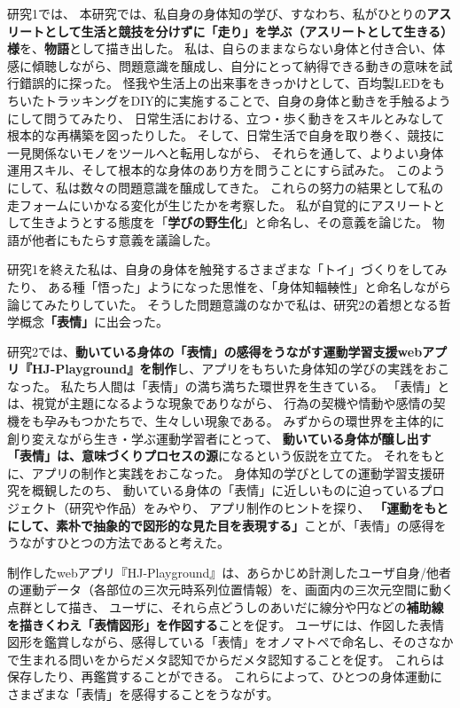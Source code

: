 研究1では、
本研究では、私自身の身体知の学び、すなわち、私がひとりの\textbf{アスリートとして生活と競技を分けずに「走り」を学ぶ（アスリートとして生きる）様}を、\textbf{物語}として描き出した。
私は、自らのままならない身体と付き合い、体感に傾聴しながら、問題意識を醸成し、自分にとって納得できる動きの意味を試行錯誤的に探った。
怪我や生活上の出来事をきっかけとして、百均製LEDをもちいたトラッキングをDIY的に実施することで、自身の身体と動きを手触るようにして問うてみたり、
日常生活における、立つ・歩く動きをスキルとみなして根本的な再構築を図ったりした。
そして、日常生活で自身を取り巻く、競技に一見関係ないモノをツールへと転用しながら、
それらを通して、よりよい身体運用スキル、そして根本的な身体のあり方を問うことにすら試みた。
このようにして、私は数々の問題意識を醸成してきた。
これらの努力の結果として私の走フォームにいかなる変化が生じたかを考察した。
私が自覚的にアスリートとして生きようとする態度を「\textbf{学びの野生化}」と命名し、その意義を論じた。
物語が他者にもたらす意義を議論した。

研究1を終えた私は、自身の身体を触発するさまざまな「トイ」づくりをしてみたり、
ある種「悟った」ようになった思惟を、「身体知輻輳性」と命名しながら論じてみたりしていた。
そうした問題意識のなかで私は、研究2の着想となる哲学概念\textbf{「表情」}に出会った。

研究2では、\textbf{動いている身体の「表情」の感得をうながす運動学習支援webアプリ『HJ-Playground』を制作}し、アプリをもちいた身体知の学びの実践をおこなった。
私たち人間は「表情」の満ち満ちた環世界を生きている。
「表情」とは、視覚が主題になるような現象でありながら、
行為の契機や情動や感情の契機をも孕みもつかたちで、生々しい現象である。
みずからの環世界を主体的に創り変えながら生き・学ぶ運動学習者にとって、
\textbf{動いている身体が醸し出す「表情」は、意味づくりプロセスの源}になるという仮説を立てた。
それをもとに、アプリの制作と実践をおこなった。
身体知の学びとしての運動学習支援研究を概観したのち、
動いている身体の「表情」に近しいものに迫っているプロジェクト（研究や作品）をみやり、
アプリ制作のヒントを探り、
\textbf{「運動をもとにして、素朴で抽象的で図形的な見た目を表現する」}ことが、「表情」の感得をうながすひとつの方法であると考えた。

制作したwebアプリ『HJ-Playground』は、あらかじめ計測したユーザ自身/他者の運動データ（各部位の三次元時系列位置情報）を、画面内の三次元空間に動く点群として描き、
ユーザに、それら点どうしのあいだに線分や円などの\textbf{補助線を描きくわえ「表情図形」を作図する}ことを促す。
ユーザには、作図した表情図形を鑑賞しながら、感得している「表情」をオノマトペで命名し、そのさなかで生まれる問いをからだメタ認知でからだメタ認知することを促す。
これらは保存したり、再鑑賞することができる。
これらによって、ひとつの身体運動にさまざまな「表情」を感得することをうながす。

